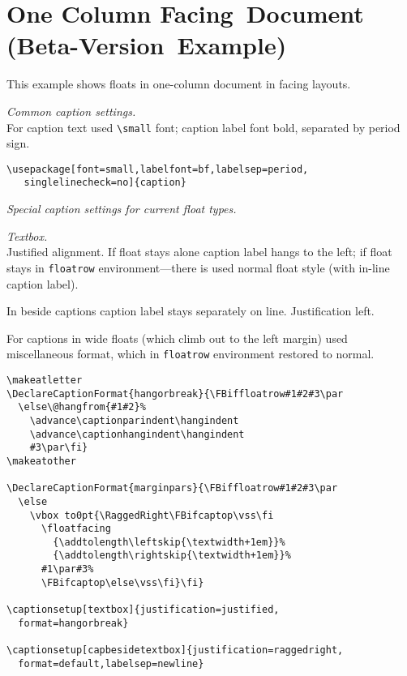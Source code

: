 \documentclass{book}
\providecommand*{\env}[1]{\texttt{#1}}
\begin{document}
\providecommand\RaggedRight{\raggedright}

\chapter{One Column Facing~Document
(Beta-Version~Example)}
\begin{sl}
This example shows floats in one-column document in facing layouts.

\emph{Common caption settings.}\\
For caption text used \verb|\small| font;
caption label font bold, separated
by period sign.
\begin{verbatim}
\usepackage[font=small,labelfont=bf,labelsep=period,
   singlelinecheck=no]{caption}
\end{verbatim}

\emph{Special caption settings for current float types.}

\emph{Textbox.}\\
Justified alignment.
If float stays alone caption label hangs to the left;
if float stays in \env{floatrow} environment---there is used normal float style (with in-line caption label).

In beside captions caption label stays separately on line. Justification left.

For captions in wide floats (which climb out to the left margin) used miscellaneous format,
which in \env{floatrow} environment restored to normal.
\begin{verbatim}
\makeatletter
\DeclareCaptionFormat{hangorbreak}{\FBiffloatrow#1#2#3\par
  \else\@hangfrom{#1#2}%
    \advance\captionparindent\hangindent
    \advance\captionhangindent\hangindent
    #3\par\fi}
\makeatother

\DeclareCaptionFormat{marginpars}{\FBiffloatrow#1#2#3\par
  \else
    \vbox to0pt{\RaggedRight\FBifcaptop\vss\fi
      \floatfacing
        {\addtolength\leftskip{\textwidth+1em}}%
        {\addtolength\rightskip{\textwidth+1em}}%
      #1\par#3%
      \FBifcaptop\else\vss\fi}\fi}

\captionsetup[textbox]{justification=justified,
  format=hangorbreak}

\captionsetup[capbesidetextbox]{justification=raggedright,
  format=default,labelsep=newline}


\end{verbatim}
\end{sl}
\end{document}
